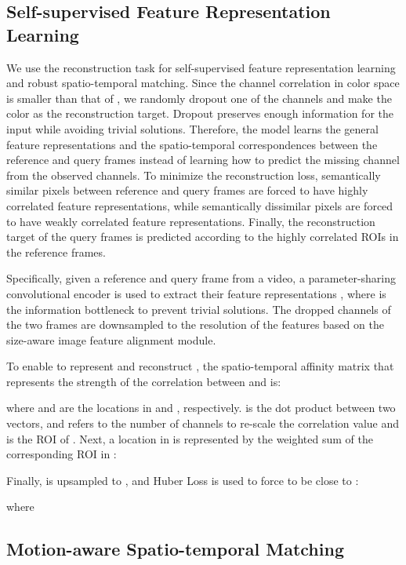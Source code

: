 \documentclass[letterpaper]{article} \usepackage{aaai22}  \usepackage{times}  \usepackage{helvet}  \usepackage{courier}  \usepackage[hyphens]{url}  \usepackage{graphicx} \urlstyle{rm} \def\UrlFont{\rm}  \usepackage{natbib}  \usepackage{caption} \DeclareCaptionStyle{ruled}{labelfont=normalfont,labelsep=colon,strut=off} \frenchspacing  \setlength{\pdfpagewidth}{8.5in}  \setlength{\pdfpageheight}{11in}  \usepackage{algorithm}
\begin{document}
\subsection{Self-supervised Feature Representation Learning}
We use the reconstruction task for self-supervised feature representation learning and robust spatio-temporal matching. Since the channel correlation in  color space is smaller than that of  \cite{ColorTransfer}, we randomly dropout one of the  channels and make the  color as the reconstruction target. Dropout preserves enough information for the input while avoiding trivial solutions. Therefore, the model learns the general feature representations and the spatio-temporal correspondences between the reference and query frames instead of learning how to predict the missing channel from the observed channels. To minimize the reconstruction loss, semantically similar pixels between reference and query frames are forced to have highly correlated feature representations, while semantically dissimilar pixels are forced to have weakly correlated feature representations. Finally, the reconstruction target of the query frames is predicted according to the highly correlated ROIs in the reference frames.

Specifically, given a reference and query frame  from a video, a parameter-sharing convolutional encoder  is used to extract their feature representations , where  is the information bottleneck to prevent trivial solutions. The dropped channels of the two frames  are downsampled to the resolution of the features  based on the size-aware image feature alignment module.


To enable  to represent and reconstruct , the spatio-temporal affinity matrix  that represents the strength of the correlation between  and  is:

where  and  are the locations in  and , respectively.  is the dot product between two vectors, and  refers to the number of channels to re-scale the correlation value and  is the ROI of . Next, a location  in  is represented by the weighted sum of the corresponding ROI in :



Finally,  is upsampled to , and Huber Loss  is used to force  to be close to :

\noindent where



\subsection{Motion-aware Spatio-temporal Matching}
\end{document}

